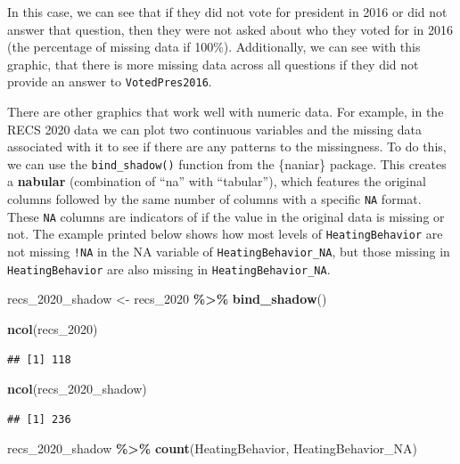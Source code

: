 \documentclass[
]{krantz}
\makeatletter
\newenvironment{Shaded}{\begin{snugshade}}{\end{snugshade}}
\newcommand{\FunctionTok}[1]{\textcolor[rgb]{0.27,0.27,0.27}{\textbf{#1}}}
\newcommand{\NormalTok}[1]{#1}
\newcommand{\OtherTok}[1]{\textcolor[rgb]{0.37,0.37,0.37}{#1}}
\newcommand{\SpecialCharTok}[1]{\textcolor[rgb]{0.43,0.43,0.43}{\textbf{#1}}}
\newenvironment{kframe}{%
\medskip{}
\setlength{\fboxsep}{.8em}
 \def\at@end@of@kframe{}%
 \ifinner\ifhmode%
  \def\at@end@of@kframe{\end{minipage}}%
  \begin{minipage}{\columnwidth}%
 \fi\fi%
 \def\FrameCommand##1{\hskip\@totalleftmargin \hskip-\fboxsep
 \colorbox{shadecolor}{##1}\hskip-\fboxsep
     \hskip-\linewidth \hskip-\@totalleftmargin \hskip\columnwidth}%
 \MakeFramed {\advance\hsize-\width
   \@totalleftmargin\z@ \linewidth\hsize
   \@setminipage}}%
 {\par\unskip\endMakeFramed%
 \at@end@of@kframe}
\renewenvironment{Shaded}{\begin{kframe}}{\end{kframe}}
\makeatother
\begin{document}
In this case, we can see that if they did not vote for president in 2016 or did not answer that question, then they were not asked about who they voted for in 2016 (the percentage of missing data if 100\%). Additionally, we can see with this graphic, that there is more missing data across all questions if they did not provide an answer to \texttt{VotedPres2016}.

There are other graphics that work well with numeric data. For example, in the RECS 2020 data we can plot two continuous variables and the missing data associated with it to see if there are any patterns to the missingness. To do this, we can use the \texttt{bind\_shadow()} function from the \{naniar\} package. This creates a \textbf{nabular} (combination of ``na'' with ``tabular''), which features the original columns followed by the same number of columns with a specific \texttt{NA} format. These \texttt{NA} columns are indicators of if the value in the original data is missing or not. The example printed below shows how most levels of \texttt{HeatingBehavior} are not missing \texttt{!NA} in the NA variable of \texttt{HeatingBehavior\_NA}, but those missing in \texttt{HeatingBehavior} are also missing in \texttt{HeatingBehavior\_NA}.

\begin{Shaded}
\begin{Highlighting}[]
\NormalTok{recs\_2020\_shadow }\OtherTok{\textless{}{-}}\NormalTok{ recs\_2020 }\SpecialCharTok{\%\textgreater{}\%}
  \FunctionTok{bind\_shadow}\NormalTok{()}

\FunctionTok{ncol}\NormalTok{(recs\_2020)}
\end{Highlighting}
\end{Shaded}

\begin{verbatim}
## [1] 118
\end{verbatim}

\begin{Shaded}
\begin{Highlighting}[]
\FunctionTok{ncol}\NormalTok{(recs\_2020\_shadow)}
\end{Highlighting}
\end{Shaded}

\begin{verbatim}
## [1] 236
\end{verbatim}

\begin{Shaded}
\begin{Highlighting}[]
\NormalTok{recs\_2020\_shadow }\SpecialCharTok{\%\textgreater{}\%}
  \FunctionTok{count}\NormalTok{(HeatingBehavior, HeatingBehavior\_NA)}
\end{Highlighting}
\end{Shaded}
\end{document}

